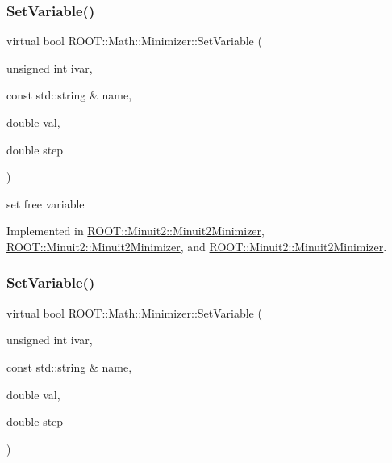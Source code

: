 \subsubsection{\texorpdfstring{SetVariable()}{SetVariable()}\hspace{0.1cm}{\footnotesize\ttfamily [2/3]}}
{\footnotesize\ttfamily virtual bool R\+O\+O\+T\+::\+Math\+::\+Minimizer\+::\+Set\+Variable (\begin{DoxyParamCaption}\item[{unsigned int}]{ivar,  }\item[{const std\+::string \&}]{name,  }\item[{double}]{val,  }\item[{double}]{step }\end{DoxyParamCaption})\hspace{0.3cm}{\ttfamily [pure virtual]}}



set free variable 



Implemented in \mbox{\hyperlink{classROOT_1_1Minuit2_1_1Minuit2Minimizer_a951ad856f74ded3c64836fa28fdf9bb5}{R\+O\+O\+T\+::\+Minuit2\+::\+Minuit2\+Minimizer}}, \mbox{\hyperlink{classROOT_1_1Minuit2_1_1Minuit2Minimizer_a951ad856f74ded3c64836fa28fdf9bb5}{R\+O\+O\+T\+::\+Minuit2\+::\+Minuit2\+Minimizer}}, and \mbox{\hyperlink{classROOT_1_1Minuit2_1_1Minuit2Minimizer_a951ad856f74ded3c64836fa28fdf9bb5}{R\+O\+O\+T\+::\+Minuit2\+::\+Minuit2\+Minimizer}}.

\mbox{\label{classROOT_1_1Math_1_1Minimizer_a8661a2ac86372602f32f97b3d9262421}} 
\subsubsection{\texorpdfstring{SetVariable()}{SetVariable()}\hspace{0.1cm}{\footnotesize\ttfamily [3/3]}}
{\footnotesize\ttfamily virtual bool R\+O\+O\+T\+::\+Math\+::\+Minimizer\+::\+Set\+Variable (\begin{DoxyParamCaption}\item[{unsigned int}]{ivar,  }\item[{const std\+::string \&}]{name,  }\item[{double}]{val,  }\item[{double}]{step }\end{DoxyParamCaption})\hspace{0.3cm}{\ttfamily [pure virtual]}}



